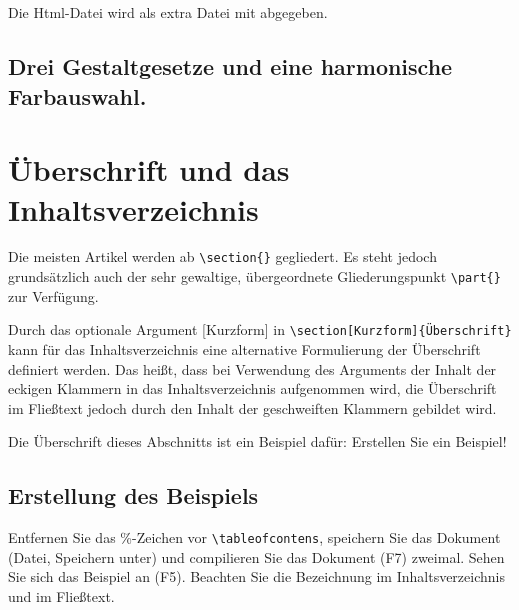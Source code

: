 \documentclass[a4paper,%
twoside,							%
headsepline=true,				%
footsepline=true,				%
headings=normal,
listof=totoc,					%
bibliography=totoc,			%
listof=entryprefix,
]
{scrartcl}
\begin{document}
\cite[vgl.][2]{Hönemann2019:Farbwahrnehmung} \\
\cite{Hönemann2019:Bewegungswahrnehmung} \\
\cite{Schultz:Gestaltgesetze}\\
\cite{GoldsteinE.Bruce2015W:dG}\\
Die Html-Datei wird als extra Datei mit abgegeben.


\subsection{Drei Gestaltgesetze und eine harmonische Farbauswahl.}
\label{sec:AufgabeEinsA}

\section[Überschriften]{Überschrift und das Inhaltsverzeichnis}
Die meisten Artikel werden ab \verb#\section{}# gegliedert. Es steht jedoch grundsätzlich auch der sehr gewaltige, übergeordnete Gliederungspunkt \verb#\part{}# zur Verfügung.

Durch das optionale Argument [Kurzform] in \verb#\section[Kurzform]{Überschrift}# kann für das Inhaltsverzeichnis eine alternative Formulierung der Überschrift definiert werden. Das heißt, dass bei Verwendung des Arguments der Inhalt der eckigen Klammern in das Inhaltsverzeichnis aufgenommen wird, die Überschrift im Fließtext jedoch durch den Inhalt der geschweiften Klammern gebildet wird. 

Die Überschrift dieses Abschnitts ist ein Beispiel dafür: Erstellen Sie ein Beispiel!

\subsection{Erstellung des Beispiels}
Entfernen Sie das \%-Zeichen vor \verb#\tableofcontens#, speichern Sie das Dokument (Datei, Speichern unter) und compilieren Sie das Dokument (F7) zweimal. Sehen Sie sich das Beispiel an (F5). Beachten Sie die Bezeichnung im Inhaltsverzeichnis und im Fließtext.
\end{document}
